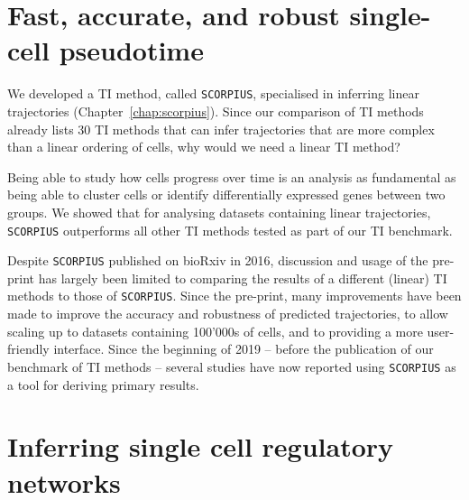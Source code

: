 \section{Fast, accurate, and robust single-cell pseudotime}

We developed a TI method, called \texttt{SCORPIUS}, specialised in inferring linear trajectories (Chapter~\ref{chap:scorpius}). Since our comparison of TI methods already lists 30 TI methods that can infer trajectories that are more complex than a linear ordering of cells, why would we need a linear TI method?

Being able to study how cells progress over time is an analysis as fundamental as being able to cluster cells or identify differentially expressed genes between two groups. We showed that for analysing datasets containing linear trajectories, \texttt{SCORPIUS} outperforms all other TI methods tested as part of our TI benchmark. 

Despite \texttt{SCORPIUS} published on bioRxiv in 2016, discussion and usage of the pre-print has largely been limited to comparing the results of a different (linear) TI methods to those of \texttt{SCORPIUS}. Since the pre-print, many improvements have been made to improve the accuracy and robustness of predicted trajectories, to allow scaling up to datasets containing 100'000s of cells, and to providing a more user-friendly interface. Since the beginning of 2019 -- before the publication of our benchmark of TI methods -- several studies have now reported using \texttt{SCORPIUS} as a tool for deriving primary results\cite{damond_maphumantype_2019, cheng_multifactorialheterogeneityvirusspecific_2019, tibbitt_singlecellrnasequencing_2019, hove_singlecellatlasmouse_2019, wouters_singlecellgeneregulatory_2019}.


\section{Inferring single cell regulatory networks}


